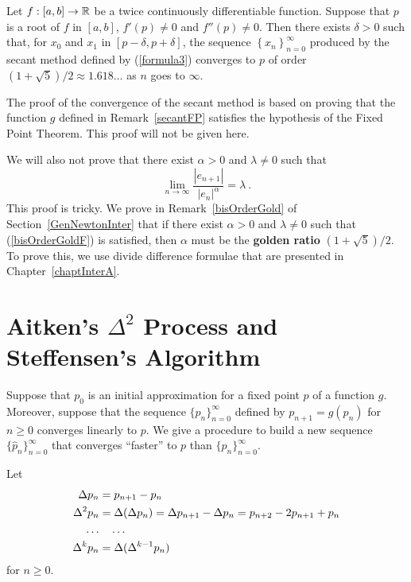 \begin{theorem}
Let $f:[a,b] \rightarrow \mathbb{R}$ be a twice continuously differentiable
function.  Suppose that $p$ is a root of $f$ in $[a,b]$,
$f'(p) \neq 0$ and $f''(p) \neq 0$.  Then there exists $\delta > 0$
such that, for $x_0$ and $x_1$ in $[p-\delta, p + \delta]$, the
sequence $\displaystyle \left\{x_n\right\}_{n=0}^\infty$ produced by
the secant method defined by (\ref{formula3}) converges to $p$ of order
$(1+\sqrt{5})/2 \approx 1.618\ldots$ as $n$ goes to $\infty$.
\end{theorem}

The proof of the convergence of the secant method is based on
proving that the function $g$ defined in Remark~\ref{secantFP}
satisfies the hypothesis of the Fixed Point Theorem.  This proof will
not be given here.

We will also not prove that there exist $\alpha>0$ and $\lambda \neq 0$
such that
\begin{equation} \label{bisOrderGoldF}
\lim_{n\rightarrow \infty} \frac{|e_{n+1}|}{|e_n|^\alpha} = \lambda \ .
\end{equation}
This proof is tricky.  We prove in Remark~\ref{bisOrderGold}
of Section~\ref{GenNewtonInter} that if there exist $\alpha>0$ and
$\lambda \neq 0$ such that (\ref{bisOrderGoldF}) is satisfied, then
$\alpha$ must be the {\bfseries golden ratio}
$(1+\sqrt{5})/2$.   To prove this, we use divide difference
formulae that are presented in Chapter~\ref{chaptInterA}.

\section{Aitken's $\Delta^2$ Process and Steffensen's Algorithm}

Suppose that $p_0$ is an initial approximation for a fixed point $p$
of a function $g$.  Moreover, suppose that the sequence
$\{p_n\}_{n=0}^\infty$ defined by $p_{n+1} = g(p_n)$ for $n \geq 0$
converges linearly to $p$.  We give a procedure to build a new
sequence $\displaystyle \{\hat{p}_n\}_{n=0}^\infty$ that converges
``faster'' to $p$ than $\{p_n\}_{n=0}^\infty$.

Let
\begin{align*}
\Delta{p_n} &= p_{n+1} - p_n\\
\Delta^{2}{p_n} &= \Delta{(\Delta{p_n})} = \Delta{p_{n+1}} - \Delta{p_n}
= p_{n+2} - 2p_{n+1} + p_n \\
\ldots &\quad \ldots \\
\Delta^{k}{p_n} &= \Delta{(\Delta^{k-1}{p_n})}
\end{align*}
for $n \geq 0$.

